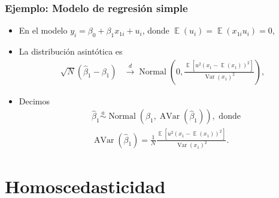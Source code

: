 \documentclass[t, compress, spanish, aspectratio=169]{beamer}
\DeclareMathOperator{\Var}{Var}
\DeclareMathOperator{\Avar}{AVar}
\DeclareMathOperator{\N}{Normal}
\DeclareMathOperator{\E}{\mathbb{E}}
\newcommand{\dto}{\stackrel{d}{\longrightarrow}}
\newcommand{\adistr}{\stackrel{a}{\sim}}
\begin{document}
%	
%	
	
	\begin{frame}
			\frametitle{Ejemplo: Modelo de regresi\'on simple}
			\begin{itemize}
				\item[] En el modelo $y_i = \beta_0 + \beta_1 x_{1i}+u_i$, donde $\E(u_i)=\E(x_{1i}u_i)=0$,
				\item La distribuci\'on asint\'otica es
			\begin{align*}
				\sqrt{N} (\hat \beta_1 - \beta_1) &\dto \N (0,\frac{\E[u^2(x_1 -\E (x_1))^2]}{\Var(x_1)^2}),
			\end{align*}				
			\item Decimos
			\begin{align*}
				&\hat \beta_1 \adistr \N(\beta_1,\Avar(\hat\beta_1)),\text{ donde}\\
				&\Avar(\hat\beta_1)=\frac{1}{N}\frac{\E[u^2(x_1 -\E (x_1))^2]}{\Var(x_1)^2}.
			\end{align*}
		\end{itemize}
	\end{frame}

%

	\section{Homoscedasticidad}

%	
\end{document}
